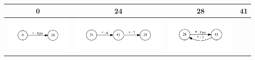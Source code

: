 \documentclass{matmex-diploma}
\begin{document}
\begin{table}[h]
  \centering
  \begin{tabular}{ | c | c | c | c | }
    \hline
    0 & 24 & 28 & 41 \\ \hline
    \begin{minipage}{.22\textwidth}
      \includegraphics[width=\linewidth]{0_tok}
    \end{minipage}
    &
    \begin{minipage}{.22\textwidth}
      \includegraphics[width=\linewidth]{24_tok}
    \end{minipage}
    & 
    \begin{minipage}{.22\textwidth}
      \includegraphics[width=\linewidth]{28_tok}
    \end{minipage}

\end{tabular}
\end{table}
\end{document}
